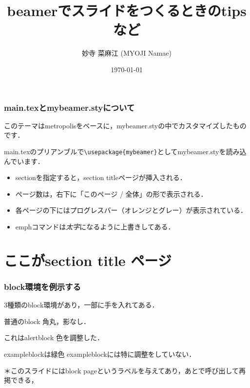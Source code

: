 \documentclass[unicode, 9pt, aspectratio=169]{beamer}
\title{beamerでスライドをつくるときのtipsなど}
\author{妙寺 菜麻江 (MYOJI Namae)}
\institute{所属，institute}
\date{\today}
\begin{document}
\newcommand{\NoTranslate}[1]{#1}
\pdfstringdefDisableCommands{\let\translate\NoTranslate}

\maketitle

\begin{frame}[fragile] %
  \frametitle{main.texとmybeamer.styについて}
  このテーマはmetropolisをベースに，mybeamer.styの中でカスタマイズしたものです．

  main.texのプリアンブルで\lstinline|\usepackage{mybeamer}|としてmybeamer.styを読み込んでいます．

  \begin{block}{}
    \begin{itemize}
      \item sectionを指定すると，section titleページが挿入される．
      \item ページ数は，右下に「このページ / 全体」の形で表示される．
      \item 各ページの下にはプログレスバー（オレンジとグレー）が表示されている．
      \item emphコマンドは\emph{太字}になるように上書きしてある．
    \end{itemize}
  \end{block}
\end{frame}

\section{ここがsection title ページ}

\begin{frame}[label=blockpage] %
  \frametitle{block環境を例示する}
  3種類のblock環境があり，一部に手を入れてある．
  \begin{block}{普通のblock}
    角丸，影なし．
  \end{block}

  \begin{alertblock}{これはalertblock}
    色を調整した．
  \end{alertblock}

  \begin{exampleblock}{exampleblockは緑色}
    exampleblockには特に調整をしていない．
  \end{exampleblock}

  ＊このスライドにはblock pageというラベルを与えてあり，あとで呼び出して再掲できる，
\end{frame}
\end{document}
